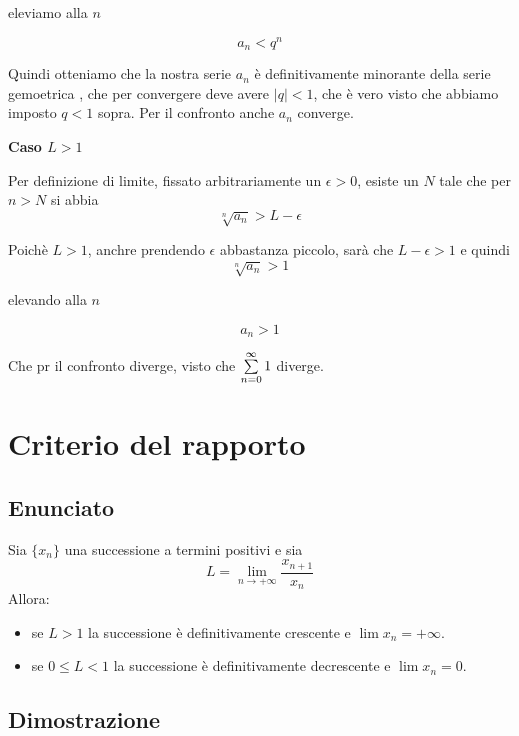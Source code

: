 eleviamo alla $n$

$$a_n < q^n$$

Quindi otteniamo che la nostra serie $a_n$ è definitivamente minorante della serie gemoetrica , che per convergere deve avere $|q|<1$, che è vero visto che abbiamo imposto $q < 1$ sopra. Per il confronto anche $a_n$ converge.

\textbf{Caso $L>1$}

Per definizione di limite, fissato arbitrariamente un $\epsilon>0$, esiste un $N$ tale che per $n>N$ si abbia $$\sqrt[n]{a_n} > L-\epsilon$$

Poichè $L>1$, anchre prendendo $\epsilon$ abbastanza piccolo, sarà che $L-\epsilon>1$ e quindi
$$\sqrt[n]{a_n} > 1$$

elevando alla $n$

$$a_n > 1$$

Che pr il confronto diverge, visto che $\sum\limits_{n=0}^{\infty}1$ diverge.

\section{Criterio del rapporto}

\subsection{Enunciato}

Sia $\{x_n\}$ una successione a termini positivi e sia 
\begin{equation*}
L = \lim_{n \to +\infty} \frac{x_{n+1}}{x_n}
\end{equation*}
Allora:
\begin{itemize}
\item se $L > 1$ la successione è definitivamente crescente e $\lim x_n = +\infty$.
\item se $0 \le L < 1$ la successione è definitivamente decrescente e $\lim x_n = 0$.
\end{itemize}

\subsection{Dimostrazione}

